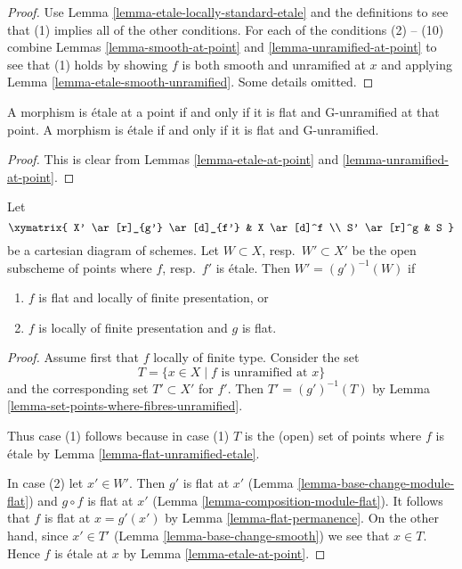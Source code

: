 \begin{proof}
Use Lemma \ref{lemma-etale-locally-standard-etale}
and the definitions to see that (1) implies all
of the other conditions. For each of the conditions
(2) -- (10) combine Lemmas \ref{lemma-smooth-at-point}
and \ref{lemma-unramified-at-point} to see
that (1) holds by showing $f$ is both smooth and unramified
at $x$ and applying Lemma \ref{lemma-etale-smooth-unramified}.
Some details omitted.
\end{proof}

\begin{lemma}
\label{lemma-flat-unramified-etale}
A morphism is \'etale at a point if and only if it is flat and G-unramified
at that point.
A morphism is \'etale if and only if it is flat and G-unramified.
\end{lemma}

\begin{proof}
This is clear from Lemmas \ref{lemma-etale-at-point}
and \ref{lemma-unramified-at-point}.
\end{proof}

\begin{lemma}
\label{lemma-set-points-where-fibres-etale}
Let
$$
\xymatrix{
X' \ar[r]_{g'} \ar[d]_{f'} & X \ar[d]^f \\
S' \ar[r]^g & S
}
$$
be a cartesian diagram of schemes. Let $W \subset X$, resp.\ $W' \subset X'$
be the open subscheme of points where $f$, resp.\ $f'$ is \'etale.
Then $W' = (g')^{-1}(W)$ if
\begin{enumerate}
\item $f$ is flat and locally of finite presentation, or
\item $f$ is locally of finite presentation and $g$ is flat.
\end{enumerate}
\end{lemma}

\begin{proof}
Assume first that $f$ locally of finite type. Consider the set
$$
T = \{x \in X \mid f\text{ is unramified at }x\}
$$
and the corresponding set $T' \subset X'$ for $f'$. Then
$T' = (g')^{-1}(T)$ by
Lemma \ref{lemma-set-points-where-fibres-unramified}.

\medskip\noindent
Thus case (1) follows because in case (1) $T$ is the (open) set of points
where $f$ is \'etale by Lemma \ref{lemma-flat-unramified-etale}.

\medskip\noindent
In case (2) let $x' \in W'$. Then $g'$ is flat at $x'$
(Lemma \ref{lemma-base-change-module-flat}) and
$g \circ f$ is flat at $x'$ (Lemma \ref{lemma-composition-module-flat}).
It follows that $f$ is flat at $x = g'(x')$
by Lemma \ref{lemma-flat-permanence}. On the other hand, since
$x' \in T'$ (Lemma \ref{lemma-base-change-smooth})
we see that $x \in T$. Hence $f$ is \'etale at $x$ by
Lemma \ref{lemma-etale-at-point}.
\end{proof}

